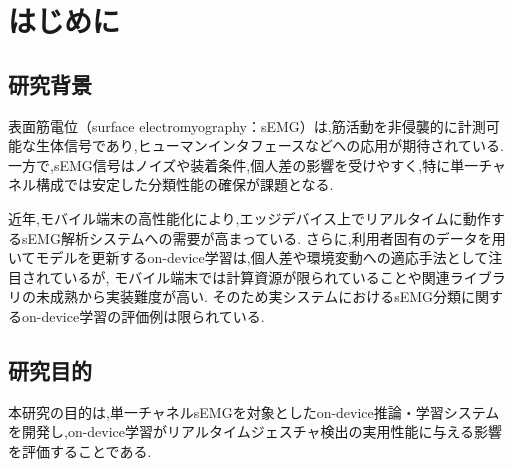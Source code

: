 \chapter{はじめに}

\section{研究背景}
表面筋電位（surface electromyography：sEMG）は,筋活動を非侵襲的に計測可能な生体信号であり,ヒューマンインタフェースなどへの応用が期待されている.一方で,sEMG信号はノイズや装着条件,個人差の影響を受けやすく,特に単一チャネル構成では安定した分類性能の確保が課題となる.

近年,モバイル端末の高性能化により,エッジデバイス上でリアルタイムに動作するsEMG解析システムへの需要が高まっている.
さらに,利用者固有のデータを用いてモデルを更新するon-device学習は,個人差や環境変動への適応手法として注目されているが,
モバイル端末では計算資源が限られていることや関連ライブラリの未成熟から実装難度が高い. そのため実システムにおけるsEMG分類に関するon-device学習の評価例は限られている.

\section{研究目的}
本研究の目的は,単一チャネルsEMGを対象としたon-device推論・学習システムを開発し,on-device学習がリアルタイムジェスチャ検出の実用性能に与える影響を評価することである.
